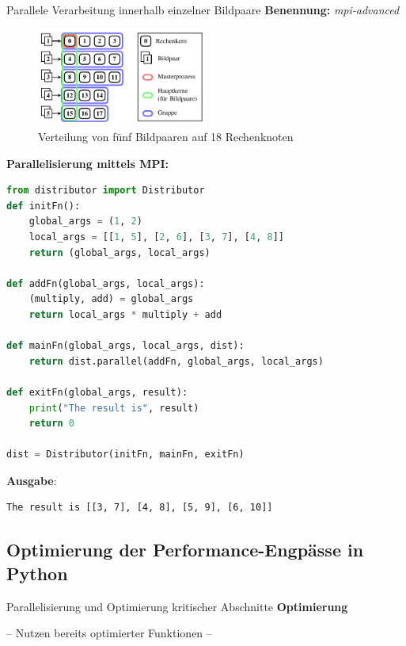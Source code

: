 \begin{frame}{Parallele Verarbeitung innerhalb einzelner Bildpaare}
	\textbf{Benennung:} \textit{mpi-advanced}
	\begin{figure}[h]
		\centering
		\includegraphics[width=0.5\textwidth]{pdf/parallel}
		\caption[Verteilung]{Verteilung von fünf Bildpaaren auf 18 Rechenknoten}
	\end{figure}
	
	\framebreak
	
	\textbf{Parallelisierung mittels MPI:}
	\begin{lstlisting}[language=Python]
from distributor import Distributor
def initFn():
	global_args = (1, 2)
	local_args = [[1, 5], [2, 6], [3, 7], [4, 8]]
	return (global_args, local_args)
	
def addFn(global_args, local_args):
	(multiply, add) = global_args
	return local_args * multiply + add
	
def mainFn(global_args, local_args, dist):
	return dist.parallel(addFn, global_args, local_args)
	
def exitFn(global_args, result):
	print("The result is", result)
	return 0
	
dist = Distributor(initFn, mainFn, exitFn)
	\end{lstlisting}
	
	\framebreak
	
	\textbf{Ausgabe}:
	\begin{lstlisting}
The result is [[3, 7], [4, 8], [5, 9], [6, 10]]
	\end{lstlisting}
\end{frame}

\subsection{Optimierung der Performance-Engpässe in Python}
\begin{frame}{Parallelisierung und Optimierung kritischer Abschnitte}
	\centering
	\LARGE
	\textbf{Optimierung}
	
	\vspace{0.5cm}
	
	\large
	-- Nutzen bereits optimierter Funktionen --
\end{frame}

